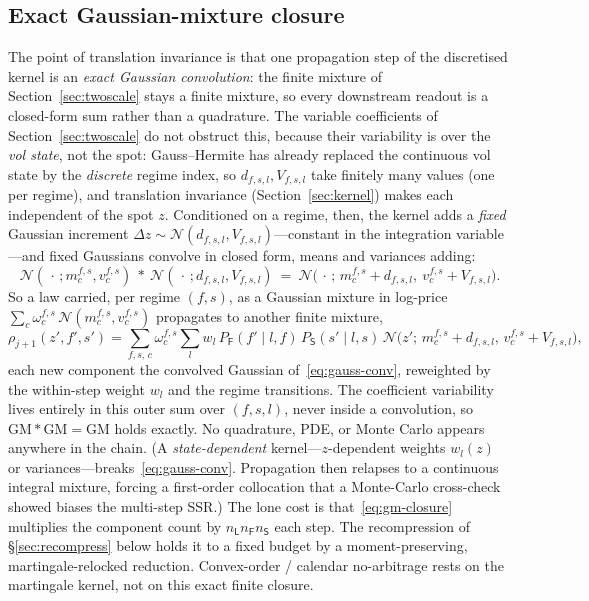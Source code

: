 \documentclass[11pt]{article}
\newcommand{\cN}{\mathcal{N}}
\begin{document}
\subsection{Exact Gaussian-mixture closure}
The point of translation invariance is that one propagation step of the discretised kernel is an
\emph{exact Gaussian convolution}: the finite mixture of Section~\ref{sec:twoscale} stays a finite
mixture, so every downstream readout is a closed-form sum rather than a quadrature. The variable
coefficients of Section~\ref{sec:twoscale} do not obstruct this, because their variability is over the
\emph{vol state}, not the spot: Gauss--Hermite has already replaced the continuous vol state by the
\emph{discrete} regime index, so $d_{f,s,l},V_{f,s,l}$ take finitely many values (one per regime), and
translation invariance (Section~\ref{sec:kernel}) makes each independent of the spot $z$.
Conditioned on a regime, then, the kernel adds a \emph{fixed} Gaussian increment
$\Delta z\sim\cN(d_{f,s,l},V_{f,s,l})$---constant in the integration variable---and fixed Gaussians
convolve in closed form, means and variances adding:
\begin{equation}
\cN(\,\cdot\,;m^{f,s}_c,v^{f,s}_c)\ \ast\ \cN(\,\cdot\,;d_{f,s,l},V_{f,s,l})
\ =\ \cN\!\big(\,\cdot\,;\,m^{f,s}_c+d_{f,s,l},\ v^{f,s}_c+V_{f,s,l}\big).
\label{eq:gauss-conv}
\end{equation}
So a law carried, per regime $(f,s)$, as a Gaussian mixture in log-price
$\sum_c\omega^{f,s}_c\,\cN(m^{f,s}_c,v^{f,s}_c)$ propagates to another finite mixture,
\begin{equation}
\rho_{j+1}(z',f',s')=\sum_{f,s,\,c}\omega^{f,s}_c\sum_{l}w_l\,
P_{\mathsf{F}}(f'\!\mid\! l,f)\,P_{\mathsf{S}}(s'\!\mid\! l,s)\,
\cN\!\big(z';\,m^{f,s}_c+d_{f,s,l},\,v^{f,s}_c+V_{f,s,l}\big),
\label{eq:gm-closure}
\end{equation}
each new component the convolved Gaussian of~\eqref{eq:gauss-conv}, reweighted by the within-step
weight $w_l$ and the regime transitions. The coefficient variability lives entirely in this outer sum
over $(f,s,l)$, never inside a convolution, so $\mathrm{GM}\ast\mathrm{GM}=\mathrm{GM}$ holds exactly.
No quadrature, PDE, or Monte Carlo appears anywhere in the chain. (A \emph{state-dependent}
kernel---$z$-dependent weights $w_l(z)$ or variances---breaks~\eqref{eq:gauss-conv}. Propagation
then relapses to a continuous integral mixture, forcing a first-order collocation that a
Monte-Carlo cross-check showed biases the multi-step SSR.) The lone cost is that~\eqref{eq:gm-closure}
multiplies the component count by $n_{\mathsf{L}}n_{\mathsf{F}}n_{\mathsf{S}}$ each step. The
recompression of \S\ref{sec:recompress} below holds it to a fixed budget by a moment-preserving,
martingale-relocked reduction. Convex-order / calendar no-arbitrage rests on the martingale
kernel, not on this exact finite closure.
\end{document}
